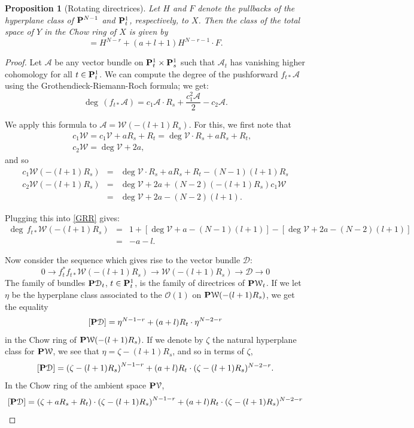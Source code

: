 \documentclass[reqno, 10 pt]{article}
\newtheorem{prop}[thm]{Proposition}
\theoremstyle{definition}
\theoremstyle{remark}
\numberwithin{equation}{section}
\numberwithin{thm}{section}
\numberwithin{prop}{section}
\numberwithin{lem}{section}
\numberwithin{cor}{section}
\numberwithin{conj}{section}
\numberwithin{defn}{section}
\newcommand{\cA}{{\mathcal A}}
\renewcommand{\cD}{{\mathcal D}}
\newcommand{\cO}{{\mathcal O}}
\newcommand{\cV}{{\mathcal V}}
\newcommand{\cW}{{\mathcal W}}
\renewcommand{\P}{{\bf P}}
\begin{document}
\begin{prop}[Rotating directrices]\label{a+l+1}
Let $H$ and $F$ denote the pullbacks of the hyperplane class of $\P^{N-1}$ and $\P^{1}_{t}$, respectively, to $X$. Then the class of the total space of $Y$ in the Chow ring of $X$ is given by 
\begin{equation}
[Y] = H^{N-r} + (a+l+1)H^{N-r-1}\cdot F.
\end{equation}
\end{prop}
\begin{proof}
Let $\cA$ be any vector bundle on ${\bf P}^1_{t} \times {\bf P}^1_{s}$ such that $\cA_{t}$ has vanishing higher cohomology for all $t \in \P^{1}_{t}$.  We can compute the degree of the pushforward $f_{t*}\cA$ using the Grothendieck-Riemann-Roch formula; we get:
\begin{equation}\label{GRR}
\deg \, (f_{t*}\cA) = c_1\cA\cdot R_s + \frac{c_1^2\cA}{2}-c_2\cA.
\end{equation}

We apply this formula to $\cA = \cW(-(l+1)R_s)$.  For this, we first note that 
\begin{eqnarray*}
&&c_1\cW = c_1\cV + aR_s+R_t = \deg \cV\cdot R_s +a R_s +R_t,\\
&&c_2\cW = \deg \cV + 2a,
\end{eqnarray*}
and so 
\begin{eqnarray*}
c_1\cW(-(l+1)R_s) &=& \deg \cV\cdot R_s +a R_s +R_t - (N-1)(l+1)R_s\\
c_2\cW(-(l+1)R_s) &=& \deg \cV + 2a + (N-2)(-(l+1)R_s)c_1 \cW\\
&=& \deg \cV + 2a - (N-2)(l+1).
\end{eqnarray*}


Plugging this into \eqref{GRR} gives:
\begin{eqnarray*}
\deg \, f_{t*}\cW(-(l+1)R_s) &=& 1 + [\deg \cV + a - (N-1)(l+1)] - [\deg \cV + 2a - (N-2)(l+1)]\\
&=& -a-l.
\end{eqnarray*}

Now consider the sequence which gives rise to the vector bundle $\cD$: \[0 \longrightarrow f_{t}^*f_{t*}\cW(-(l+1)R_s) \longrightarrow \cW(-(l+1)R_s) \longrightarrow \cD \longrightarrow 0\] The family of bundles ${\bf P}\cD_{t}$, $t \in \P^{1}_{t}$, is the family of directrices of ${\bf P}\cW_t$. If we let $\eta$ be the hyperplane class associated to the $\cO(1)$ on ${\bf P}\cW(-(l+1)R_s)$, we get the equality \[[{\bf P}\cD] = \eta^{N-1-r} +(a+l)R_t\cdot \eta^{N-2-r}\] in the Chow ring of ${\bf P}\cW(-(l+1)R_s)$.  If we denote by $\zeta$ the natural hyperplane class for ${\bf P}\cW$, we see that $\eta = \zeta - (l+1)R_s$, and so in terms of $\zeta$, \[[{\bf P}\cD] = \left( \zeta - (l+1)R_s\right)^{N-1-r} + (a+l)R_t\cdot ( \zeta - (l+1)R_s)^{N-2-r}.\] In the Chow ring of the ambient space ${\bf P}\cV$,\[[{\bf P}\cD] = (\zeta + aR_s+R_t)\cdot \left( \zeta - (l+1)R_s\right)^{N-1-r} + (a+l)R_t\cdot ( \zeta - (l+1)R_s)^{N-2-r}\]



\end{proof}
\end{document}
